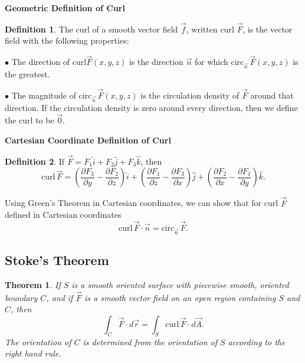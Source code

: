 \documentclass[12pt, a4paper]{article}
\theoremstyle{plain}
\newtheorem{theorem}{Theorem}[section]
\theoremstyle{definition}
\newtheorem{definition}{Definition}[section]
\theoremstyle{remark}
\begin{document}
\textbf{Geometric Definition of Curl}

\begin{definition}
The curl of a smooth vector field $\vec{f}$, written curl $\vec{F}$, is the vector field with the following properties:

$\bullet$ The direction of curl$\vec{F} (x, y, z)$ is the direction $\vec{n}$ for which $ \text{circ}_{\vec{n}} \, \vec{F}(x, y, z)$ is the greatest.

$\bullet$ The magnitude of $ \text{circ}_{\vec{n}} \, \vec{F}(x, y, z)$ is the circulation density of $\vec{F}$ around that direction. If the circulation density is zero around every direction, then we define the curl to be $\vec{0}$.
\end{definition}


\textbf{Cartesian Coordinate Definition of Curl}

\begin{definition}
If $\vec{F} = F_1 \hat{i} + F_2 \hat{j} + F_3 \hat{k}$, then 
$$ \text{curl} \, \vec{F} = \left( \frac{\partial F_3}{\partial y} - \frac{\partial F_2}{\partial z} \right)\hat{i}+
 \left( \frac{\partial F_1}{\partial z} - \frac{\partial F_3}{\partial x} \right)\hat{j}+
 \left( \frac{\partial F_2}{\partial x} - \frac{\partial F_1}{\partial y} \right)\hat{k} .$$
\end{definition}


Using Green's Theorem in Cartesian coordinates, we can show that for curl $\vec{F}$ defined in Cartesian coordinates 
$$ \text{curl} \, \vec{F} \cdot \vec{n} = \text{circ}_{\vec{n}} \, \vec{F}.$$

\subsection{Stoke's Theorem}

\begin{theorem}
If $S$ is a smooth oriented surface with piecewise smooth, oriented boundary $C$, and if $\vec{F}$ is a smooth vector field on an open region containing $S$ and $C$, then 
$$\int_C \vec{F} \cdot d\vec{r} = \int_S \text{curl} \, \vec{F} \cdot d \vec{A}. $$
The orientation of $C$ is determined from the orientation of $S$ according to the right hand rule. 
\end{theorem}
\end{document}

